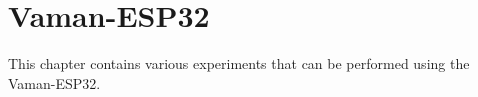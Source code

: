 \chapter{Vaman-ESP32}
This chapter contains various experiments that can be performed using the 
Vaman-ESP32.








